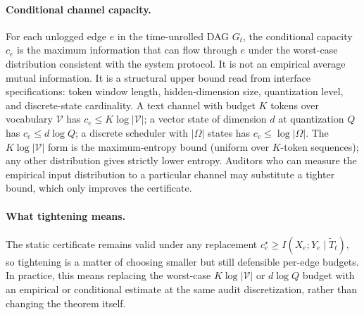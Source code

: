 \documentclass{article}
\begin{document}
\paragraph{Conditional channel capacity.}
For each unlogged edge $e$ in the time-unrolled DAG $G_t$, the conditional capacity $c_e$ is the maximum information that can flow through $e$ under the worst-case distribution consistent with the system protocol. It is not an empirical average mutual information. It is a structural upper bound read from interface specifications: token window length, hidden-dimension size, quantization level, and discrete-state cardinality. A text channel with budget $K$ tokens over vocabulary $\mathcal{V}$ has $c_e \leq K \log |\mathcal{V}|$; a vector state of dimension $d$ at quantization $Q$ has $c_e \leq d \log Q$; a discrete scheduler with $|\Omega|$ states has $c_e \leq \log |\Omega|$. The $K \log |\mathcal{V}|$ form is the maximum-entropy bound (uniform over $K$-token sequences); any other distribution gives strictly lower entropy. Auditors who can measure the empirical input distribution to a particular channel may substitute a tighter bound, which only improves the certificate.

\paragraph{What tightening means.}
The static certificate remains valid under any replacement $c_e^\star \geq I(X_e; Y_e \mid \tilde T_t)$, so tightening is a matter of choosing smaller but still defensible per-edge budgets. In practice, this means replacing the worst-case $K \log |\mathcal{V}|$ or $d \log Q$ budget with an empirical or conditional estimate at the same audit discretization, rather than changing the theorem itself.
\end{document}
